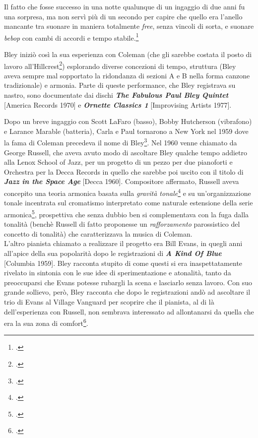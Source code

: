 \begin{fquote}
	Il fatto che fosse successo in una notte qualunque di un ingaggio di due anni fu una sorpresa, ma non servì più di un secondo per capire che quello era l'anello mancante tra suonare in maniera totalmente \textit{free}, senza vincoli di sorta, e suonare \textit{bebop} con cambi di accordi e tempo stabile.\footcite[64]{stopping}
\end{fquote}
Bley iniziò così la sua esperienza con Coleman (che gli sarebbe costata il posto di lavoro all'Hillcrest\footcite[51]{cappelletti}) esplorando diverse concezioni di tempo, struttura (Bley aveva sempre mal sopportato la ridondanza di sezioni A e B nella forma canzone tradizionale) e armonia. Parte di queste performance, che Bley registrava su nastro, sono documentate dai dischi \textbf{\textit{The Fabulous Paul Bley Quintet}} [America Records 1970] e \textbf{\textit{Ornette Classics 1}} [Improvising Artists 1977]. \par
Dopo un breve ingaggio con Scott LaFaro (basso), Bobby Hutcherson (vibrafono) e Larance Marable (batteria), Carla e Paul tornarono a New York nel 1959 dove la fama di Coleman precedeva il nome di Bley\footcite[70]{stopping}. Nel 1960 venne chiamato da George Russell, che aveva avuto modo di ascoltare Bley qualche tempo addietro alla Lenox School of Jazz, per un progetto di un pezzo per due pianoforti e Orchestra per la Decca Records in quello che sarebbe poi uscito con il titolo di \textit{\textbf{Jazz in the Space Age}} [Decca 1960]. Compositore affermato, Russell aveva concepito una teoria armonica basata sulla \textit{gravità tonale}\footcite[3]{russell} e su un'organizzazione tonale incentrata sul cromatismo interpretato come naturale estensione della serie armonica\footcite[12]{russell}, prospettiva che senza dubbio ben si complementava con la fuga dalla tonalità (benchè Russell di fatto proponesse un \textit{rafforzamento} parossistico del concetto di tonalità) che caratterizzava la musica di Coleman.\\
L'altro pianista chiamato a realizzare il progetto era Bill Evans, in quegli anni all'apice della sua popolarità dopo le registrazioni di \textit{\textbf{A Kind Of Blue}} [Columbia 1959]. Bley racconta stupito di come questi si era inaspettatamente rivelato in sintonia con le sue idee di sperimentazione e atonalità, tanto da preoccuparsi che Evans potesse rubargli la scena e lasciarlo senza lavoro. Con suo grande sollievo, però, Bley racconta che dopo le registrazioni andò ad ascoltare il trio di Evans al Village Vanguard per scoprire che il pianista, al di là dell'esperienza con Russell, non sembrava interessato ad allontanarsi da quella che era la sua zona di comfort\footcite[75]{stopping}.\par
